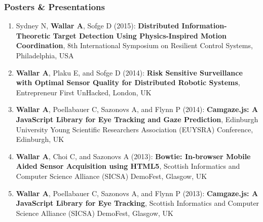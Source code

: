 \documentclass[line,margin]{cv}
\begin{document}
\begin{resume}
\begin{enumerate}
\end{enumerate}


\subsubsection{Posters \& Presentations}

\begin{enumerate}

    \item Sydney N, \textbf{Wallar A}, Sofge D (2015):
        \textbf{Distributed Information-Theoretic Target Detection Using
            Physics-Inspired Motion Coordination}, 8th International Symposium on
            Resilient Control Systems, Philadelphia, USA

    \item \textbf{Wallar A}, Plaku E, and Sofge D (2014): \textbf{Risk
        Sensitive Surveillance with Optimal Sensor Quality for Distributed
        Robotic Systems}, Entrepreneur First UnHacked, London, UK

    \item \textbf{Wallar A}, Poellabauer C, Sazonovs A, and Flynn P (2014):
        \textbf{Camgaze.js: A JavaScript Library for Eye Tracking and Gaze
        Prediction}, Edinburgh University Young Scientific Researchers
        Association (EUYSRA) Conference, Edinburgh, UK

    \item \textbf{Wallar A}, Choi C, and Sazonovs A (2013): \textbf{Bowtie:
        In-browser Mobile Aided Sensor Acquisition using HTML5}, Scottish
        Informatics and Computer Science Alliance (SICSA) DemoFest,
        Glasgow, UK

    \item \textbf{Wallar A}, Poellabauer C, Sazonovs A, and Flynn P (2013):
        \textbf{Camgaze.js: A JavaScript Library for Eye Tracking}, Scottish
        Informatics and Computer Science Alliance (SICSA) DemoFest, Glasgow, UK

\end{enumerate}


\end{resume}
\end{document}

